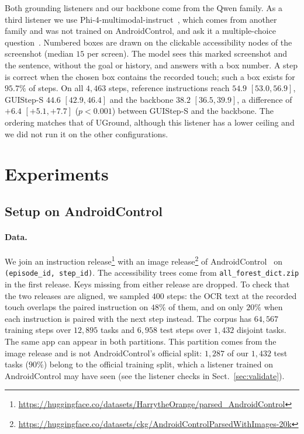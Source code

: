 \documentclass[runningheads,a4paper]{llncs}
\begin{document}
Both grounding listeners and our backbone come from the Qwen family. As a third listener we use Phi-4-multimodal-instruct~\cite{phi4}, which comes from another family and was not trained on AndroidControl, and ask it a multiple-choice question~\cite{som}. Numbered boxes are drawn on the clickable accessibility nodes of the screenshot (median $15$ per screen). The model sees this marked screenshot and the sentence, without the goal or history, and answers with a box number. A step is correct when the chosen box contains the recorded touch; such a box exists for $95.7\%$ of steps. On all $4{,}463$ steps, reference instructions reach $54.9$ $[53.0,56.9]$,
\mbox{GUIStep-S} $44.6$ $[42.9,46.4]$ and the backbone $38.2$ $[36.5,39.9]$, a difference of $+6.4$
$[+5.1,+7.7]$ ($p<0.001$) between \mbox{GUIStep-S} and the backbone. The ordering matches that of UGround,
although this listener has a lower ceiling and we did not run it on the other configurations.

\section{Experiments}
\label{sec:results}

\subsection{Setup on AndroidControl}
\label{sec:setup}


\paragraph{Data.}
We join an instruction release\footnote{\url{https://huggingface.co/datasets/HarrytheOrange/parsed_AndroidControl}}
with an image release\footnote{\url{https://huggingface.co/datasets/ckg/AndroidControlParsedWithImages-20k}}
of AndroidControl~\cite{androidcontrol} on \texttt{(episode\_id, step\_id)}. The accessibility trees come from
\texttt{all\_\allowbreak forest\_\allowbreak dict.zip} in the first release. Keys missing from either release are dropped. To check that the two releases are aligned, we sampled $400$ steps: the OCR text at the recorded touch overlaps the paired instruction on $48\%$ of them, and on only $20\%$ when each instruction is paired with the next step instead. The corpus has $64{,}567$ training steps over $12{,}895$ tasks and
$6{,}958$ test steps over $1{,}432$ disjoint tasks. The same app can appear in both partitions. This partition comes from the image release and is not AndroidControl's official split: $1{,}287$ of our $1{,}432$ test tasks ($90\%$) belong to the official training split, which a listener trained on AndroidControl may have seen (see the listener checks in Sect.~\ref{sec:validate}).
\end{document}
